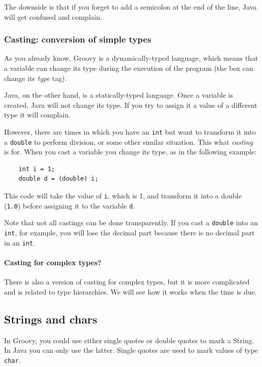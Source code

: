 The downside is that if you forget to add a semicolon at the end of
the line, 
Java will get confused and complain. 


\subsubsection{Casting: conversion of simple types}
\label{sec:cast-conv-simple}

As you already know, Groovy is a dynamically-typed language, which
means that a variable can change its type during the execution of the
program (the box can change its \emph{type} tag). 

Java, on the other hand, is a statically-typed language. Once a
variable is created, Java will not change its type. If you try to
assign it a value of a different type it will complain.

However, there are times in which you have an \verb+int+ but want to
transform it into a \verb+double+ to perform division, or some other
similar situation. This what \emph{casting} is for. When you cast a
variable you change its type, as in the following example: 

\begin{verbatim}
    int i = 1;
    double d = (double) i;
\end{verbatim}

This code will take the value of \verb+i+, which is 1, and transform
it into a double (\verb+1.0+) before assigning it to the
variable \verb+d+. 

Note that not all castings can be done transparently. If you cast a
\verb+double+ into an \verb+int+, for example, you will lose the
decimal part because there is no decimal part in an \verb+int+. 

\paragraph{Casting for complex types?}
\label{sec:cast-compl-types}

There is also a version of casting for complex types, but it is more
complicated and is related to type hierarchies. We will see how it
works when the time is due.

\subsection{Strings and chars}
\label{sec:strings-chars}

In Groovy, you could use either single quotes or double quotes to mark
a String. In Java you can only use the latter. Single quotes are used
to mark values of type \verb+char+. 

